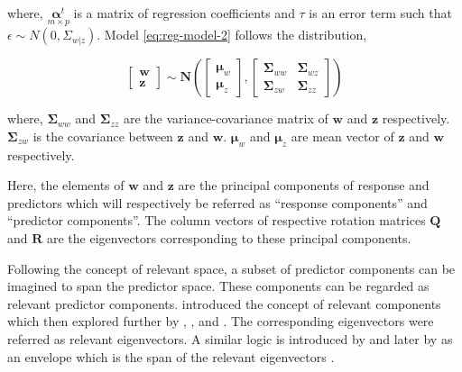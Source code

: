 \documentclass[12pt,3p,authoryear]{elsarticle}
\theoremstyle{definition}
\theoremstyle{definition}
\theoremstyle{definition}
\theoremstyle{remark}
\begin{document}
where, \(\underset{m\times p}{\boldsymbol{\alpha}^t}\) is a matrix of
regression coefficients and \(\tau\) is an error term such that
\(\epsilon \sim N(0, \Sigma_{w|z})\). Model \eqref{eq:reg-model-2} follows
the distribution,

\begin{equation}
  \begin{bmatrix}
    \mathbf{w} \\ \mathbf{z}
  \end{bmatrix} \sim \mathbf{N}
  \left(
    \begin{bmatrix}
      \boldsymbol{\mu}_w \\
      \boldsymbol{\mu}_z
    \end{bmatrix},
    \begin{bmatrix}
    \boldsymbol{\Sigma}_{ww} & \boldsymbol{\Sigma}_{wz} \\
    \boldsymbol{\Sigma}_{zw} & \boldsymbol{\Sigma}_{zz}
    \end{bmatrix}
  \right)
  \label{eq:model-2}
\end{equation}

where, \(\boldsymbol{\Sigma}_{ww}\) and \(\boldsymbol{\Sigma}_{zz}\) are
the variance-covariance matrix of \(\mathbf{w}\) and \(\mathbf{z}\)
respectively. \(\boldsymbol{\Sigma}_{zw}\) is the covariance between
\(\mathbf{z}\) and \(\mathbf{w}\). \(\boldsymbol{\mu}_w\) and
\(\boldsymbol{\mu}_z\) are mean vector of \(\mathbf{z}\) and
\(\mathbf{w}\) respectively.

Here, the elements of \(\mathbf{w}\) and \(\mathbf{z}\) are the
principal components of response and predictors which will respectively
be referred as ``response components'' and ``predictor components''. The
column vectors of respective rotation matrices \(\mathbf{Q}\) and
\(\mathbf{R}\) are the eigenvectors corresponding to these principal
components.

Following the concept of relevant space, a subset of predictor
components can be imagined to span the predictor space. These components
can be regarded as relevant predictor components. \citet{Naes1985}
introduced the concept of relevant components which then explored
further by \citet{helland1990partial}, \citet{naes1993relevant},
\citet{Helland1994b} and \citet{Helland2000}. The corresponding
eigenvectors were referred as relevant eigenvectors. A similar logic is
introduced by \citet{cook2010envelope} and later by
\citet{cook2013envelopes} as an envelope which is the span of the
relevant eigenvectors \citep[pp.~101]{cook2018envelope}.
\end{document}
